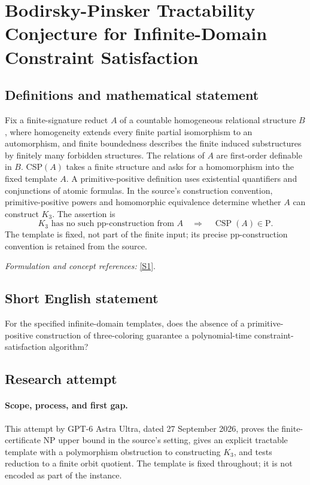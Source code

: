 \documentclass[11pt]{article}
\begin{document}
\section*{\texorpdfstring{Bodirsky-Pinsker Tractability Conjecture for Infinite-Domain Constraint Satisfaction}{Bodirsky-Pinsker Tractability Conjecture for Infinite-Domain Constraint Satisfaction}}\label{292}
\subsection{Definitions and mathematical statement}
Fix a finite-signature reduct $A$ of a countable homogeneous relational structure $B$, where homogeneity extends every finite partial isomorphism to an automorphism, and finite boundedness describes the finite induced substructures by finitely many forbidden structures. The relations of $A$ are first-order definable in $B$. CSP$(A)$ takes a finite structure and asks for a homomorphism into the fixed template $A$. A primitive-positive definition uses existential quantifiers and conjunctions of atomic formulas. In the source's construction convention, primitive-positive powers and homomorphic equivalence determine whether $A$ can construct $K_3$. The assertion is
\[
 K_3\text{ has no such pp-construction from }A
 \quad\Longrightarrow\quad\operatorname{CSP}(A)\in\mathrm P.
\]
The template is fixed, not part of the finite input; its precise pp-construction convention is retained from the source.
\par\smallskip\textit{Formulation and concept references:} \href{https://arxiv.org/html/2502.06621v4}{[S1]}.

\subsection{Short English statement}
For the specified infinite-domain templates, does the absence of a primitive-positive construction of three-coloring guarantee a polynomial-time constraint-satisfaction algorithm?
\subsection{Research attempt}
\paragraph{Scope, process, and first gap.}
This attempt by GPT-6 Astra Ultra, dated 27 September 2026, proves the finite-certificate NP upper bound in the source's setting, gives an explicit tractable template with a polymorphism obstruction to constructing $K_3$, and tests reduction to a finite orbit quotient. The template is fixed throughout; it is not encoded as part of the instance.
\end{document}
